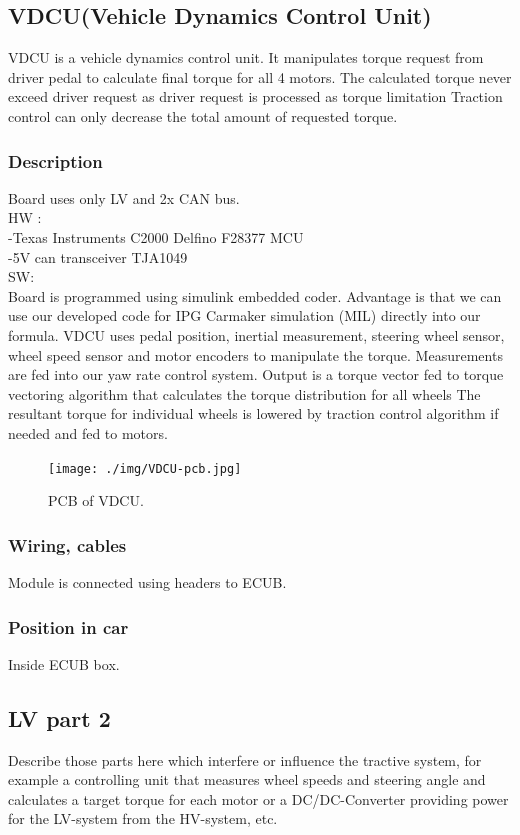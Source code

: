 \subsection{VDCU(Vehicle Dynamics Control Unit)}
VDCU is a vehicle dynamics control unit. It manipulates torque request from driver pedal to calculate final torque for all 4 motors. The calculated torque never exceed driver request as driver request is processed as torque limitation Traction control can only decrease the total amount of requested torque.

\subsubsection{Description}
Board uses only LV and 2x CAN bus.\\
HW :\\
-Texas Instruments C2000 Delfino F28377 MCU\\
-5V can transceiver TJA1049\\

\noindent SW:\\
Board is programmed using simulink embedded coder. Advantage is that we can use our developed code for IPG Carmaker simulation (MIL) directly into our formula. VDCU uses pedal position, inertial measurement, steering wheel sensor, wheel speed sensor and motor encoders to manipulate the torque. Measurements are fed into our yaw rate control system. Output is a torque vector fed to torque vectoring algorithm that calculates the torque distribution for all wheels The resultant torque for individual wheels is lowered by traction control algorithm if needed and fed to motors.

\begin{figure}[H]
	\centering
	\texttt{[image: ./img/VDCU-pcb.jpg]}
	\caption{PCB of VDCU.}
	\label{fig:VDCU-pcb}
\end{figure}

\subsubsection{Wiring, cables}
Module is connected using headers to ECUB.

\subsubsection{Position in car}
Inside ECUB box.

\subsection{LV part 2}
Describe those parts here which interfere or influence the tractive system, for example a controlling unit that measures wheel speeds and steering angle and calculates a target torque for each motor or a DC/DC-Converter providing power for the LV-system from the HV-system, etc.


